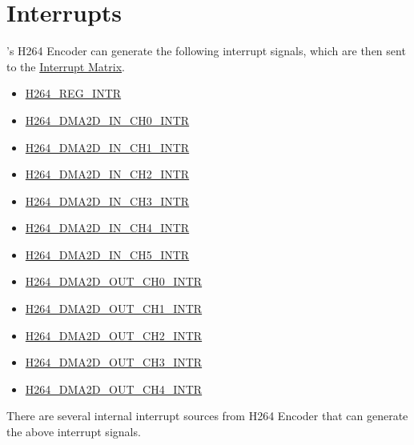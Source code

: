 \documentclass[main\_\_EN.tex]{subfiles}
\begin{document}

\section{Interrupts}
\label{sec:h264enc-interrupt}
\chipname{}'s H264 Encoder can generate the following interrupt signals, which are then sent to the \hyperref[mod:intmtrx]{Interrupt Matrix}.
    \begin{itemize}
        \item \hyperref[int:H264REGINT]{H264\_REG\_INTR}
        \item \hyperref[int:H264DMAINCHNINT]{H264\_DMA2D\_IN\_CH0\_INTR}
        \item \hyperref[int:H264DMAINCHNINT]{H264\_DMA2D\_IN\_CH1\_INTR}
        \item \hyperref[int:H264DMAINCHNINT]{H264\_DMA2D\_IN\_CH2\_INTR}
        \item \hyperref[int:H264DMAINCHNINT]{H264\_DMA2D\_IN\_CH3\_INTR}
        \item \hyperref[int:H264DMAINCHNINT]{H264\_DMA2D\_IN\_CH4\_INTR}
        \item \hyperref[int:H264DMAINCHNINT]{H264\_DMA2D\_IN\_CH5\_INTR}
        \item \hyperref[int:H264DMAOUTCHNINT]{H264\_DMA2D\_OUT\_CH0\_INTR}
        \item \hyperref[int:H264DMAOUTCHNINT]{H264\_DMA2D\_OUT\_CH1\_INTR}
        \item \hyperref[int:H264DMAOUTCHNINT]{H264\_DMA2D\_OUT\_CH2\_INTR}
        \item \hyperref[int:H264DMAOUTCHNINT]{H264\_DMA2D\_OUT\_CH3\_INTR}
        \item \hyperref[int:H264DMAOUTCHNINT]{H264\_DMA2D\_OUT\_CH4\_INTR}
    \end{itemize}

There are several internal interrupt sources from H264 Encoder that can generate the above interrupt signals.
\end{document}
